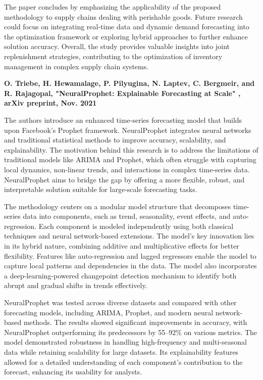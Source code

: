 The paper concludes by emphasizing the applicability of the proposed methodology to supply chains dealing with perishable goods. Future research could focus on integrating real-time data and dynamic demand forecasting into the optimization framework or exploring hybrid approaches to further enhance solution accuracy. Overall, the study provides valuable insights into joint replenishment strategies, contributing to the optimization of inventory management in complex supply chain systems.

\textbf{\cite{triebe2021neuralprophet}O. Triebe, H. Hewamalage, P. Pilyugina, N. Laptev, C. Bergmeir, and R. Rajagopal, "NeuralProphet: Explainable Forecasting at Scale" , arXiv preprint, Nov. 2021}


The authors introduce an enhanced time-series forecasting model that builds upon Facebook’s Prophet framework. NeuralProphet integrates neural networks and traditional statistical methods to improve accuracy, scalability, and explainability. The motivation behind this research is to address the limitations of traditional models like ARIMA and Prophet, which often struggle with capturing local dynamics, non-linear trends, and interactions in complex time-series data. NeuralProphet aims to bridge the gap by offering a more flexible, robust, and interpretable solution suitable for large-scale forecasting tasks.

The methodology centers on a modular model structure that decomposes time-series data into components, such as trend, seasonality, event effects, and auto-regression. Each component is modeled independently using both classical techniques and neural network-based extensions. The model’s key innovation lies in its hybrid nature, combining additive and multiplicative effects for better flexibility. Features like auto-regression and lagged regressors enable the model to capture local patterns and dependencies in the data. The model also incorporates a deep-learning-powered changepoint detection mechanism to identify both abrupt and gradual shifts in trends effectively.

NeuralProphet was tested across diverse datasets and compared with other forecasting models, including ARIMA, Prophet, and modern neural network-based methods. The results showed significant improvements in accuracy, with NeuralProphet outperforming its predecessors by 55–92\% on various metrics. The model demonstrated robustness in handling high-frequency and multi-seasonal data while retaining scalability for large datasets. Its explainability features allowed for a detailed understanding of each component’s contribution to the forecast, enhancing its usability for analysts.

